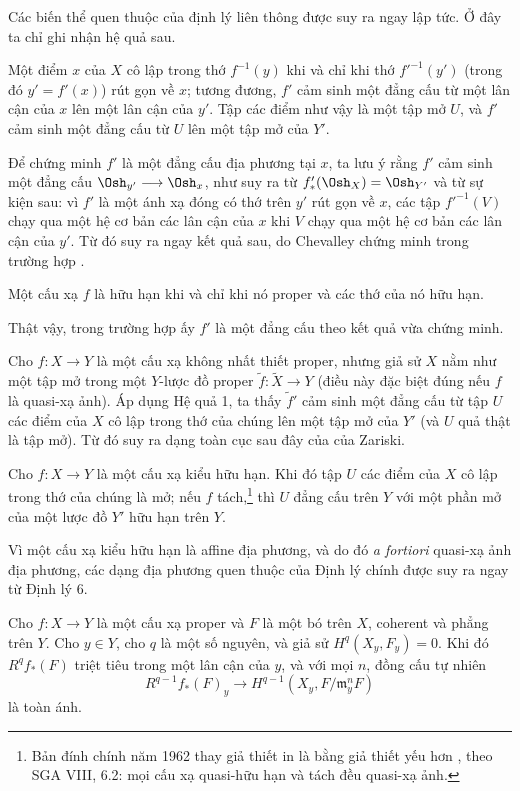 Các biến thể quen thuộc của định lý liên thông được suy ra ngay lập tức. Ở đây
ta chỉ ghi nhận hệ quả sau.

 Một điểm $x$ của $X$ cô lập trong thớ $f^{-1}(y)$ khi và
chỉ khi thớ $f'^{-1}(y')$ (trong đó $y'=f'(x)$) rút gọn về $x$; tương đương,
$f'$ cảm sinh một đẳng cấu từ một lân cận của $x$ lên một lân cận của $y'$.
Tập các điểm như vậy là một tập mở $U$, và $f'$ cảm sinh một đẳng cấu từ $U$
lên một tập mở của $Y'$.

Để chứng minh $f'$ là một đẳng cấu địa phương tại $x$, ta lưu ý rằng $f'$ cảm
sinh một đẳng cấu $\Osh_{y'}\longrightarrow\Osh_x$, như suy ra từ
$f'_*(\Osh_X)=\Osh_{Y'}$ và từ sự kiện sau: vì $f'$ là một ánh xạ đóng có thớ
trên $y'$ rút gọn về $x$, các tập $f'^{-1}(V)$ chạy qua một hệ cơ bản các lân
cận của $x$ khi $V$ chạy qua một hệ cơ bản các lân cận của $y'$. Từ đó suy ra
ngay kết quả sau, do Chevalley chứng minh trong trường hợp
.

 Một cấu xạ $f$ là hữu hạn khi và chỉ khi nó proper và các
thớ của nó hữu hạn.

Thật vậy, trong trường hợp ấy $f'$ là một đẳng cấu theo kết quả vừa chứng minh.

Cho $f:X\longrightarrow Y$ là một cấu xạ không nhất thiết proper, nhưng giả sử
$X$ nằm như một tập mở trong một $Y$-lược đồ proper
$\widetilde f:\widetilde X\longrightarrow Y$ (điều này đặc biệt đúng nếu $f$
là quasi-xạ ảnh). Áp dụng Hệ quả 1, ta thấy $\widetilde f'$ cảm sinh một đẳng
cấu từ tập $U$ các điểm của $X$ cô lập trong thớ của chúng lên một tập mở của
$Y'$ (và $U$ quả thật là tập mở). Từ đó suy ra dạng toàn cục sau đây của
 của Zariski.

 Cho
$f:X\longrightarrow Y$ là một cấu xạ kiểu hữu hạn. Khi đó tập $U$ các điểm
của $X$ cô lập trong thớ của chúng là mở; nếu $f$ tách,\footnote{Bản đính chính
năm 1962 thay giả thiết in là  bằng giả thiết yếu hơn
, theo SGA VIII, 6.2: mọi cấu xạ quasi-hữu hạn và tách đều
quasi-xạ ảnh.} thì $U$ đẳng cấu trên $Y$ với một phần mở của một lược đồ $Y'$
hữu hạn trên $Y$.

Vì một cấu xạ kiểu hữu hạn là affine địa phương, và do đó \textit{a fortiori}
quasi-xạ ảnh địa phương, các dạng địa phương quen thuộc của Định lý chính được
suy ra ngay từ Định lý 6.

 Cho $f:X\longrightarrow Y$ là một cấu xạ proper và $F$
là một bó trên $X$, coherent và phẳng trên $Y$. Cho $y\in Y$, cho $q$ là một
số nguyên, và giả sử $H^q(X_y,F_y)=0$. Khi đó $R^qf_*(F)$ triệt tiêu trong một
lân cận của $y$, và với mọi $n$, đồng cấu tự nhiên
\[
  R^{q-1}f_*(F)_y\longrightarrow
  H^{q-1}(X_y,F/\mathfrak m_y^nF)
\]
là toàn ánh.

